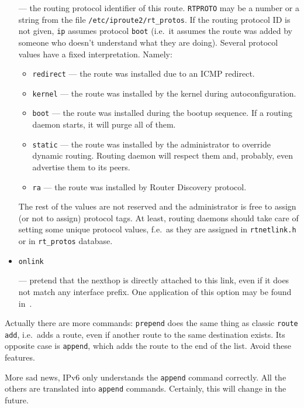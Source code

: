 \begin{itemize}
--- the routing protocol identifier of this route.
\verb|RTPROTO| may be a number or a string from the file
\verb|/etc/iproute2/rt_protos|. If the routing protocol ID is
not given, \verb|ip| assumes protocol \verb|boot| (i.e.\
it assumes the route was added by someone who doesn't
understand what they are doing). Several protocol values have a fixed interpretation.
Namely:
\begin{itemize}
\item \verb|redirect| --- the route was installed due to an ICMP redirect.
\item \verb|kernel| --- the route was installed by the kernel during
autoconfiguration.
\item \verb|boot| --- the route was installed during the bootup sequence.
If a routing daemon starts, it will purge all of them.
\item \verb|static| --- the route was installed by the administrator
to override dynamic routing. Routing daemon will respect them
and, probably, even advertise them to its peers.
\item \verb|ra| --- the route was installed by Router Discovery protocol.
\end{itemize}
The rest of the values are not reserved and the administrator is free
to assign (or not to assign) protocol tags. At least, routing
daemons should take care of setting some unique protocol values,
f.e.\ as they are assigned in \verb|rtnetlink.h| or in \verb|rt_protos|
database.


\item \verb|onlink|

--- pretend that the nexthop is directly attached to this link,
even if it does not match any interface prefix. One application of this
option may be found in~\cite{IP-TUNNELS}.

\end{itemize}


\begin{NB}
  Actually there are more commands: \verb|prepend| does the same
  thing as classic \verb|route add|, i.e.\ adds a route, even if another
  route to the same destination exists. Its opposite case is \verb|append|,
  which adds the route to the end of the list. Avoid these
  features.
\end{NB}
\begin{NB}
  More sad news, IPv6 only understands the \verb|append| command correctly.
  All the others are translated into \verb|append| commands. Certainly,
  this will change in the future.
\end{NB}

